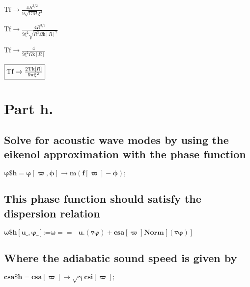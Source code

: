 \documentclass{article}
\begin{document}
\begin{doublespace}
\noindent\(\text{Tf}\to \frac{4 R^{3/2}}{9 \sqrt{G M} \xi ^2}\)
\end{doublespace}

\begin{doublespace}
\noindent\(\text{Tf}\to \frac{4 R^{3/2}}{9 \xi ^2 \sqrt{R^3 \text{$\Omega $k}[R]^2}}\)
\end{doublespace}

\begin{doublespace}
\noindent\(\text{Tf}\to \frac{4}{9 \xi ^2 \text{$\Omega $k}[R]}\)
\end{doublespace}

\begin{doublespace}
\noindent\(\fbox{$\text{Tf}\to \frac{2 \text{Tk}[R]}{9 \pi  \xi ^2}$}\)
\end{doublespace}

\section*{Part h.}

\subsection*{Solve for acoustic wave modes by using the eikenol approximation with the phase function}

\begin{doublespace}
\noindent\(\pmb{\text{$\varphi \$$h} = \varphi [\varpi ,\phi ]\to  m(f[\varpi ]-\phi );}\)
\end{doublespace}

\subsection*{This phase function should satisfy the dispersion relation}

\begin{doublespace}
\noindent\(\pmb{\text{$\omega \$$h}[\text{u$\_$},\varphi \_] \text{:=}\omega  ==\text{  }u.(\triangledown  \varphi ) +\text{csa}[\varpi ]\text{Norm}[(\triangledown
 \varphi )] }\)
\end{doublespace}

\subsection*{Where the adiabatic sound speed is given by}

\begin{doublespace}
\noindent\(\pmb{\text{csa$\$$h} = \text{csa}[\varpi ]\to  \sqrt{\gamma }\text{csi}[\varpi ];}\)
\end{doublespace}
\end{document}
